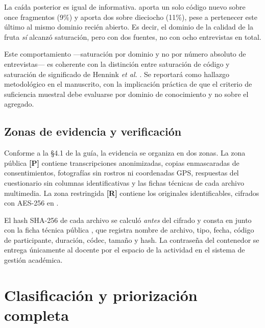 La caída posterior es igual de informativa.  aporta un solo código nuevo sobre once
fragmentos (9\%) y  aporta dos sobre dieciocho (11\%), pese a pertenecer este último al
mismo dominio recién abierto. Es decir, el dominio de la calidad de la fruta \emph{sí} alcanzó
saturación, pero con dos fuentes, no con ocho entrevistas en total.

Este comportamiento ---saturación por dominio y no por número absoluto de entrevistas--- es
coherente con la distinción entre saturación de código y saturación de significado de Hennink
\emph{et al.} \cite{hennink2017}. Se reportará como hallazgo metodológico en el manuscrito, con la
implicación práctica de que el criterio de suficiencia muestral debe evaluarse por dominio de
conocimiento y no sobre el agregado.

\subsection{Zonas de evidencia y verificación}

Conforme a la §4.1 de la guía, la evidencia se organiza en dos zonas. La zona pública \textbf{[P]}
contiene transcripciones anonimizadas, copias enmascaradas de consentimientos, fotografías sin
rostros ni coordenadas GPS, respuestas del cuestionario sin columnas identificativas y las fichas
técnicas de cada archivo multimedia. La zona restringida \textbf{[R]} contiene los originales
identificables, cifrados con AES-256 en
\allowbreak{}.

El hash SHA-256 de cada archivo se calculó \emph{antes} del cifrado y consta en
 junto con la ficha técnica pública , que registra
nombre de archivo, tipo, fecha, código de participante, duración, códec, tamaño y hash. La
contraseña del contenedor se entrega únicamente al docente por el espacio de la actividad en el
sistema de gestión académica.

\noindent{}

\newpage
\section{Clasificación y priorización completa}

